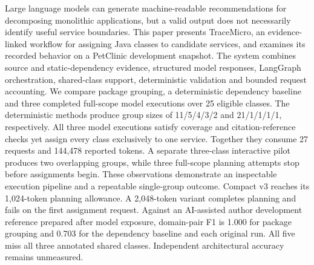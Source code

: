 Large language models can generate machine-readable recommendations for decomposing monolithic applications, but a valid output does not necessarily identify useful service boundaries. This paper presents TraceMicro, an evidence-linked workflow for assigning Java classes to candidate services, and examines its recorded behavior on a PetClinic development snapshot. The system combines source and static-dependency evidence, structured model responses, LangGraph orchestration, shared-class support, deterministic validation and bounded request accounting. We compare package grouping, a deterministic dependency baseline and three completed full-scope model executions over 25 eligible classes. The deterministic methods produce group sizes of 11/5/4/3/2 and 21/1/1/1/1, respectively. All three model executions satisfy coverage and citation-reference checks yet assign every class exclusively to one service. Together they consume 27 requests and 144,478 reported tokens. A separate three-class interactive pilot produces two overlapping groups, while three full-scope planning attempts stop before assignments begin. These observations demonstrate an inspectable execution pipeline and a repeatable single-group outcome. Compact v3 reaches its 1,024-token planning allowance. A 2,048-token variant completes planning and fails on the first assignment request. Against an AI-assisted author development reference prepared after model exposure, domain-pair F1 is 1.000 for package grouping and 0.703 for the dependency baseline and each original run. All five miss all three annotated shared classes. Independent architectural accuracy remains unmeasured.
